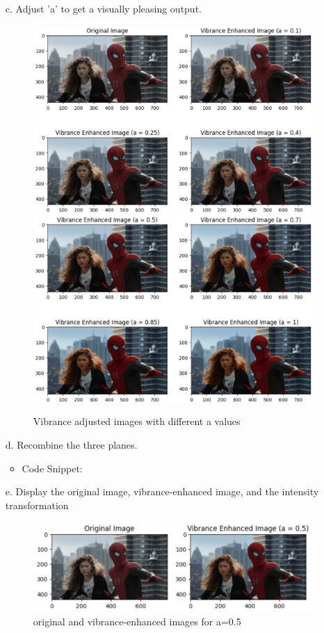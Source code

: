 \documentclass[12pt,a4paper]{article}
\begin{document}
\begin{enumerate}
    
    \item[c.] Adjust 'a' to get a visually pleasing output.
    \begin{figure}[H]
        \centering
        \includegraphics[width=0.45\linewidth]{images/Screenshots/4c1.png}
        \includegraphics[width=0.45\linewidth]{images/Screenshots/4c2.png}
        \caption{Vibrance adjusted images with different a values}
        \label{fig:enter-label}
    \end{figure}    

    
    \item[d.] Recombine the three planes.
    \begin{itemize}
        \item Code Snippet:
    \end{itemize}
    
    

    
    \item[e.] Display the original image, vibrance-enhanced image, and the intensity transformation

    \begin{figure}[H]
        \centering
        \includegraphics[width=0.6\linewidth]{images/Screenshots/4e1.png}
        \caption{original and vibrance-enhanced images for a=0.5}
        \label{fig:enter-label}
    \end{figure}


\end{enumerate}
\end{document}
